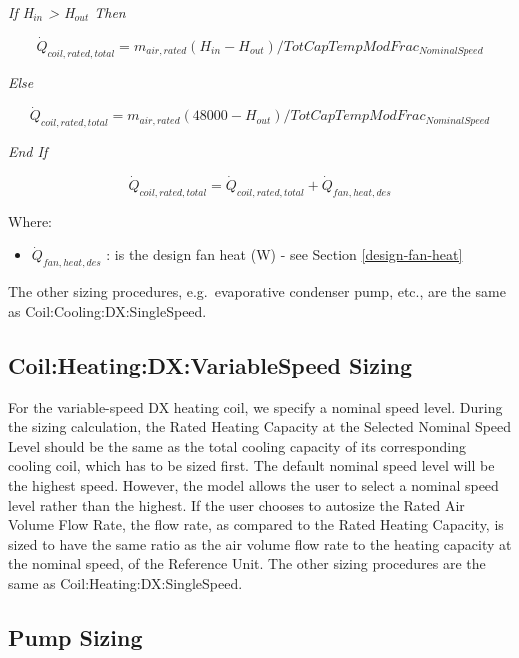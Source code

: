 \emph{If H\(_{in}\) \textgreater{} H\(_{out}\) Then}

\begin{equation}
{\dot{Q}_{coil,rated,total}} = {m_{air,rated}}({H_{in}} - {H_{out}})/TotCapTempModFra{c_{NominalSpeed}}
\end{equation}

\emph{Else}

\begin{equation}
{\dot{Q}_{coil,rated,total}} = {m_{air,rated}}(48000 - {H_{out}})/TotCapTempModFra{c_{NominalSpeed}}
\end{equation}

\emph{End If}

\begin{equation}
{\dot{Q}_{coil,rated,total}} = {\dot{Q}_{coil,rated,total}} + \dot{Q}_{fan,heat,des}
\end{equation}

Where:

\begin{itemize}
\item
  \(\dot{Q}_{fan,heat,des}\) : is the design fan heat (W) - see Section \ref{design-fan-heat}
\end{itemize}


The other sizing procedures, e.g.~evaporative condenser pump, etc., are the same as Coil:Cooling:DX:SingleSpeed.

\subsection{Coil:Heating:DX:VariableSpeed Sizing}\label{coilheatingdxvariablespeed-sizing}

For the variable-speed DX heating coil, we specify a nominal speed level. During the sizing calculation, the Rated Heating Capacity at the Selected Nominal Speed Level should be the same as the total cooling capacity of its corresponding cooling coil, which has to be sized first. The default nominal speed level will be the highest speed. However, the model allows the user to select a nominal speed level rather than the highest. If the user chooses to autosize the Rated Air Volume Flow Rate, the flow rate, as compared to the Rated Heating Capacity, is sized to have the same ratio as the air volume flow rate to the heating capacity at the nominal speed, of the Reference Unit. The other sizing procedures are the same as Coil:Heating:DX:SingleSpeed.

\subsection{Pump Sizing}\label{pump-sizing}

